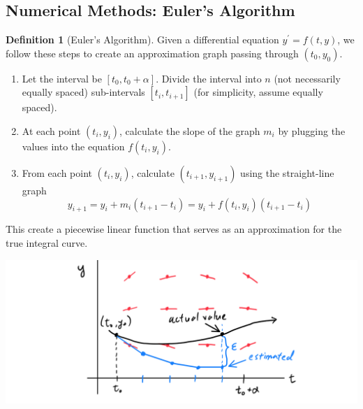 \documentclass{article}
\theoremstyle{remark}
\theoremstyle{definition}
\newtheorem{definition}{Definition}[section]
\begin{document}
  \subsection{Numerical Methods: Euler's Algorithm}

    \begin{definition}[Euler's Algorithm]
    Given a differential equation $y^\prime = f(t, y)$, we follow these steps to create an approximation graph passing through $(t_0, y_0)$. 
    \begin{enumerate}
        \item Let the interval be $[t_0, t_0 + \alpha]$. Divide the interval into $n$ (not necessarily equally spaced) sub-intervals $[t_i, t_{i+1}]$ (for simplicity, assume equally spaced). 
        \item At each point $(t_i, y_i)$, calculate the slope of the graph $m_i$ by plugging the values into the equation $f(t_i, y_i)$. 
        \item From each point $(t_i, y_i)$, calculate $(t_{i+1}, y_{i+1})$ using the straight-line graph 
        \[y_{i+1} = y_i + m_i (t_{i+1} - t_i) = y_i + f(t_i, y_i) (t_{i+1} - t_i)\]
    \end{enumerate}
    This create a piecewise linear function that serves as an approximation for the true integral curve. 
    \begin{center}
        \includegraphics[scale=0.27]{img/Euler_Algorithm.PNG}
    \end{center}
    \end{definition}
\end{document}
